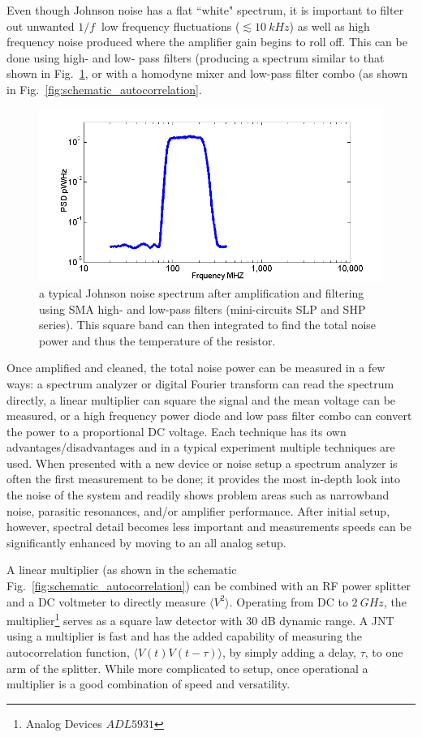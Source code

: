 Even though Johnson noise has a flat ``white" spectrum, it is important to filter out unwanted $1/f~$ low frequency fluctuations ($\lesssim 10~kHz$) as well as high frequency noise produced where the amplifier gain begins to roll off. 
This can be done using high- and low- pass filters (producing a spectrum similar to that shown in Fig.~\ref{fig:Miteq_BP_spec}, or with a homodyne mixer and low-pass filter combo (as shown in Fig.~\ref{fig:schematic_autocorrelation}. 
\begin{figure}
\includegraphics[width=\textwidth]{figures/Johnson_noise_thermometry/Miteq_BP_spec.png}
\caption{a typical Johnson noise spectrum after amplification and filtering using SMA high- and low-pass filters (mini-circuits SLP and SHP series). This square band can then integrated to find the total noise power and thus the temperature of the resistor.}
\label{fig:Miteq_BP_spec}
\end{figure}

Once amplified and cleaned, the total noise power can be measured in a few ways: a spectrum analyzer or digital Fourier transform can read the spectrum directly, a linear multiplier can square the signal and the mean voltage can be measured, or a high frequency power diode and low pass filter combo can convert the power to a proportional DC voltage. Each technique has its own advantages/disadvantages and in a typical experiment multiple techniques are used. 
When presented with a new device or noise setup a spectrum analyzer is often the first measurement to be done; it provides the most in-depth look into the noise of the system and readily shows problem areas such as narrowband noise, parasitic resonances, and/or amplifier performance. After initial setup, however, spectral detail becomes less important and measurements speeds can be significantly enhanced by moving to an all analog setup. 

A linear multiplier (as shown in the schematic Fig.~\ref{fig:schematic_autocorrelation}) can be combined with an RF power splitter and a DC voltmeter to directly measure $\langle V^2\rangle$. Operating from DC to $2~GHz$, the multiplier\footnote{Analog Devices $ADL5931$} serves as a square law detector with 30 dB dynamic range. A JNT using a multiplier is fast and has the added capability of measuring the autocorrelation function, $\langle V(t)V(t-\tau)\rangle$, by simply adding a delay, $\tau$, to one arm of the splitter. While more complicated to setup, once operational a multiplier is a good combination of speed and versatility.

